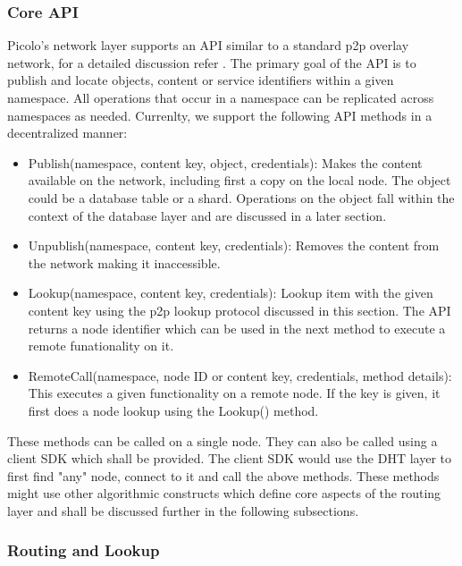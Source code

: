 \subsubsection{Core API}
\label{net:core_api}
\textsf{Picolo}'s network layer supports an API similar to a standard p2p overlay network, for a detailed discussion refer
\cite{dolr2003}. The primary goal of the API is to publish and locate objects, content or service identifiers within a given
namespace. All operations that occur in a namespace can be replicated across namespaces as needed. Currenlty, we support the following API methods in a decentralized manner:
\begin{itemize}
    \item \textsf{Publish(namespace, content key, object, credentials)}: Makes the content available on the network, including first a copy on
        the local node. The object could be a database table or a shard. Operations on the object fall within the
        context of the database layer and are discussed in a later section.
    \item \textsf{Unpublish(namespace, content key, credentials)}: Removes the content from the network making it inaccessible.
    \item \textsf{Lookup(namespace, content key, credentials)}: Lookup item with the given content key using the p2p lookup protocol
        discussed in this section. The API returns a node identifier which can be used in the next method to execute a
        remote funationality on it.
    \item \textsf{RemoteCall(namespace, node ID or content key, credentials, method details)}: This executes a given functionality
        on a remote node. If the key is given, it first does a node lookup using the \textsf{Lookup()} method.
\end{itemize}
These methods can be called on a single node. They can also be called using a client SDK which shall be provided. The
client SDK would use the DHT layer to first find "any" node, connect to it and call the above methods. These methods
might use other algorithmic constructs which define core aspects of the routing layer and shall be discussed further in
the following subsections.

\subsubsection{Routing and Lookup}
\label{net:routing}

